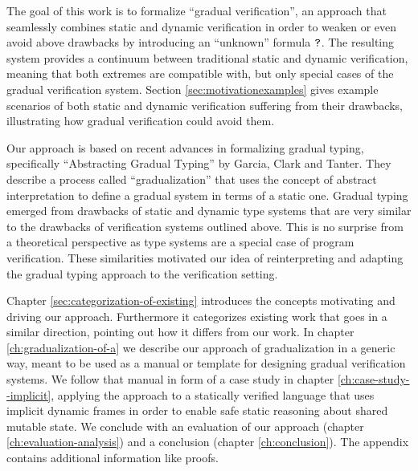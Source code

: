 The goal of this work is to formalize “gradual verification”, an approach that seamlessly combines static and dynamic verification in order to weaken or even avoid above drawbacks by introducing an “unknown” formula $\textup{\texttt{?}}$.
The resulting system provides a continuum between traditional static and dynamic verification, meaning that both extremes are compatible with, but only special cases of the gradual verification system.
Section \ref{sec:motivationexamples} gives example scenarios of both static and dynamic verification suffering from their drawbacks, illustrating how gradual verification could avoid them.

Our approach is based on recent advances in formalizing gradual typing, specifically “Abstracting Gradual Typing” \cite{garcia2016abstracting} by Garcia, Clark and Tanter.
They describe a process called “gradualization” that uses the concept of abstract interpretation to define a gradual system in terms of a static one.
Gradual typing emerged from drawbacks of static and dynamic type systems that are very similar to the drawbacks of verification systems outlined above.
This is no surprise from a theoretical perspective as type systems are a special case of program verification. 
These similarities motivated our idea of reinterpreting and adapting the gradual typing approach to the verification setting.

Chapter \ref{sec:categorization-of-existing} introduces the concepts motivating and driving our approach.
Furthermore it categorizes existing work that goes in a similar direction, pointing out how it differs from our work.
In chapter \ref{ch:gradualization-of-a} we describe our approach of gradualization in a generic way, meant to be used as a manual or template for designing gradual verification systems.
We follow that manual in form of a case study in chapter \ref{ch:case-study--implicit}, applying the approach to a statically verified language that uses implicit dynamic frames in order to enable safe static reasoning about shared mutable state.
We conclude with an evaluation of our approach (chapter \ref{ch:evaluation-analysis}) and a conclusion (chapter \ref{ch:conclusion}).
The appendix contains additional information like proofs. %

